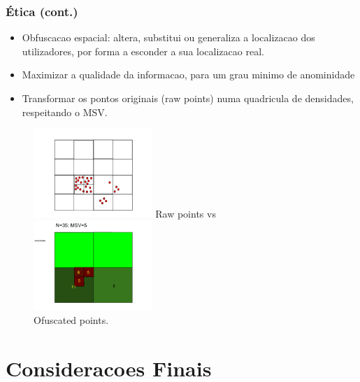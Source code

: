 \documentclass[hyperref={pdfpagelabels=true}]{beamer}
\begin{document}
\begin{frame}
\frametitle{\'{E}tica (cont.)}
\tiny{
    \begin{itemize}
        \item<1->Obfuscacao espacial: altera, substitui ou generaliza a localizacao dos utilizadores, por forma a esconder a sua localizacao real.
        \item<3->Maximizar a qualidade da informacao, para um grau minimo de anominidade
        \item<6->Transformar os pontos originais (raw points) numa quadricula de densidades, respeitando o MSV.%
    \end{itemize}                      
}    
        \begin{figure}   
            \includegraphics[width=0.4\textwidth]{raw_points.png}
            \tiny{Raw points vs}
            \includegraphics[width=0.4\textwidth]{ofuscated.png}\\
            \tiny{Ofuscated points.}            
        \end{figure} 

\end{frame}


\section{Consideracoes Finais} 
\end{document}
